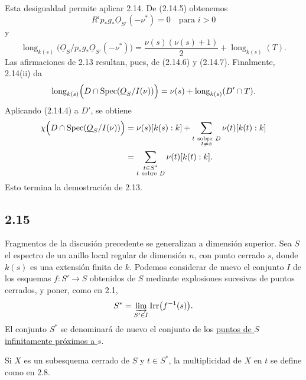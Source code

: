 \pageoriginale

Esta desigualdad permite aplicar 2.14. De (2.14.5) obtenemos
\begin{equation*}
R^ip_*g_*\underline{O}_{S'}(-\nu^*)=0
\quad\text{para }i>0
\end{equation*}
y
\begin{equation*}
\operatorname{long}_{k(s)}
\bigl(\underline{O}_S/p_*g_*\underline{O}_{S'}(-\nu^*)\bigr)
=\frac{\nu(s)(\nu(s)+1)}2+\operatorname{long}_{k(s)}(T).
\end{equation*}
Las afirmaciones de 2.13 resultan, pues, de (2.14.6) y (2.14.7). Finalmente,
2.14(ii) da
\begin{equation*}
\operatorname{long}_{k(s)}
\Bigl(D\cap\operatorname{Spec}(\underline{O}_S/I(\nu))\Bigr)
=\nu(s)+\operatorname{long}_{k(s)}(D'\cap T).
\end{equation*}
Aplicando (2.14.4) a $D'$, se obtiene
\begin{equation*}
\begin{aligned}
\chi\Bigl(D\cap\operatorname{Spec}(\underline{O}_S/I(\nu))\Bigr)
&=\nu(s)[k(s):k]
+\sum_{\substack{t\ \mathrm{sobre}\ D\\t\sisi{}{\ne s}}}
\nu(t)[k(t):k]\\
&=\sum_{\substack{t\in S^*\\t\ \mathrm{sobre}\ D}}
\nu(t)[k(t):k].
\end{aligned}
\end{equation*}
Esto termina la demostración de 2.13.

\subsection*{2.15}
Fragmentos de la discusión precedente se generalizan a dimensión superior. Sea
$S$ el espectro de un anillo local regular de dimensión $n$, con punto cerrado
$s$, donde $k(s)$ es una extensión finita de $k$. Podemos considerar de nuevo el
conjunto $I$ de los esquemas $f:S'\longrightarrow S$ obtenidos de $S$ mediante
explosiones sucesivas de puntos cerrados, y poner, como en 2.1,
\begin{equation*}
S^*=\varinjlim_{\sisi{s'}{S'}\in I}\operatorname{Irr}\bigl(f^{-1}(s)\bigr).
\end{equation*}
El conjunto $S^*$ se denominará de nuevo el conjunto de los
\underline{puntos de $S$ infinitamente próximos a $s$}.

Si $X$ es un subesquema cerrado de $S$ y $t\in S^*$, la multiplicidad de $X$ en
$t$ se define como en 2.8.

